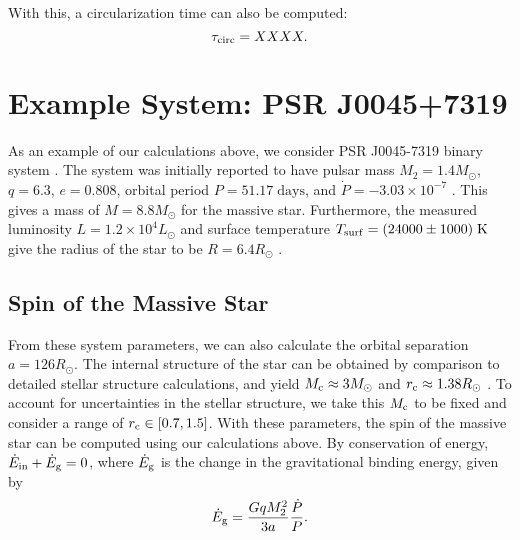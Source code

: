 \documentclass[
        fleqn,
        usenatbib,
    ]{mnras}
\begin{document}
\textcolor{Corr}{With this, a circularization time can also be computed:}
\begin{equation}
    \tau_{\rm circ} = XXXX.
\end{equation}

\section{Example System: PSR J0045+7319}\label{s:j00457319}

As an example of our calculations above, we consider PSR J0045-7319 binary
system \citep{bell1995psr}. The system was initially reported to have pulsar
mass $M_2 = 1.4M_{\odot}$, $q = 6.3$, $e = 0.808$, orbital period $P =
51.17\;\mathrm{days}$, and $\dot{P} = -3.03\times 10^{-7}$
\citep{kaspi1996params}. This gives a mass of $M = 8.8M_{\odot}$ for the massive
star. Furthermore, the measured luminosity $L = 1.2 \times 10^4L_{\odot}$ and
surface temperature $T_{\rm surf} = (24000 \pm 1000)\;\mathrm{K}$ give the
radius of the star to be $R = 6.4R_{\odot}$ \citep{kaspi1996params}.

\subsection{Spin of the Massive Star}

From these system parameters, we can also calculate the orbital separation $a =
126R_{\odot}$. The internal structure of the star can be obtained by comparison
to detailed stellar structure calculations, and yield $M_{\rm c} \approx
3M_{\odot}$ and $r_{\rm c} \approx 1.38R_{\odot}$ \citep{kumar1998}. To account
for uncertainties in the stellar structure, we take this $M_{\rm c}$ to be fixed
and consider a range of $r_{\rm c} \in [0.7, 1.5]$. With these parameters, the
spin of the massive star can be computed using our calculations above. By
conservation of energy, $\dot{E}_{\rm in} + \dot{E}_{\rm g} = 0$, where
$\dot{E}_{\rm g}$ is the change in the gravitational binding energy, given by
\begin{equation}
    \dot{E}_{\rm g} = \frac{GqM_2^2}{3a}\frac{\dot{P}}{P}.
\end{equation}
\end{document}
